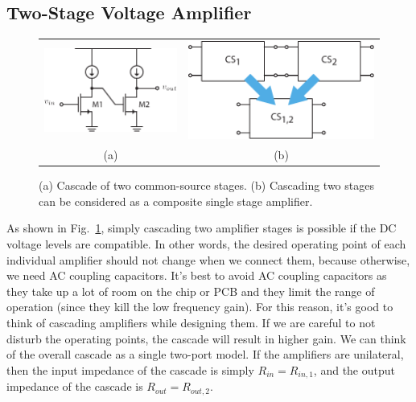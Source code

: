 \subsection{Two-Stage Voltage Amplifier}
\begin{figure}[tb]
\begin{center}
\begin{tabular}{cc}
\includegraphics[scale=1]{cs_cascade_sch} &
\includegraphics[width=.5\columnwidth]{1cascade} \\
(a) & (b) \\
\end{tabular}
\end{center}
\caption{(a) Cascade of two common-source stages.  (b) Cascading two stages can be considered as a composite single stage amplifier.}
\label{fig:1cascade}
\end{figure}

As shown in Fig.~\ref{fig:1cascade}, simply cascading two amplifier stages is possible if the DC voltage levels are compatible. In other words, the desired operating point of each individual amplifier should not change when we connect them, because otherwise, we need AC coupling capacitors.  It's best to avoid AC coupling capacitors as they take up a lot of room on the chip or PCB and they limit the range of operation (since they kill the low frequency gain).  For this reason, it's good to think of cascading amplifiers while designing them.  If we are careful to not disturb the operating points, the cascade will result in higher gain.  We can think of the overall cascade as a single two-port model.  If the amplifiers are unilateral, then the input impedance of the cascade is simply  $R_{in} = R_{in,1}$, and the output impedance of the cascade is $R_{out} = R_{out,2}$.
